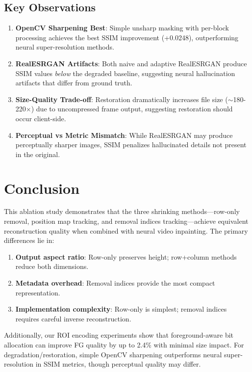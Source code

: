 \documentclass[11pt,a4paper]{article}
\begin{document}
\subsection{Key Observations}
\begin{enumerate}
    \item \textbf{OpenCV Sharpening Best}: Simple unsharp masking with per-block processing achieves the best SSIM improvement (+0.0248), outperforming neural super-resolution methods.
    \item \textbf{RealESRGAN Artifacts}: Both naive and adaptive RealESRGAN produce SSIM values \emph{below} the degraded baseline, suggesting neural hallucination artifacts that differ from ground truth.
    \item \textbf{Size-Quality Trade-off}: Restoration dramatically increases file size ($\sim$180-220$\times$) due to uncompressed frame output, suggesting restoration should occur client-side.
    \item \textbf{Perceptual vs Metric Mismatch}: While RealESRGAN may produce perceptually sharper images, SSIM penalizes hallucinated details not present in the original.
\end{enumerate}

\section{Conclusion}

This ablation study demonstrates that the three shrinking methods---row-only removal, position map tracking, and removal indices tracking---achieve equivalent reconstruction quality when combined with neural video inpainting. The primary differences lie in:

\begin{enumerate}
    \item \textbf{Output aspect ratio}: Row-only preserves height; row+column methods reduce both dimensions.
    \item \textbf{Metadata overhead}: Removal indices provide the most compact representation.
    \item \textbf{Implementation complexity}: Row-only is simplest; removal indices requires careful inverse reconstruction.
\end{enumerate}

Additionally, our ROI encoding experiments show that foreground-aware bit allocation can improve FG quality by up to 2.4\% with minimal size impact. For degradation/restoration, simple OpenCV sharpening outperforms neural super-resolution in SSIM metrics, though perceptual quality may differ.
\end{document}
